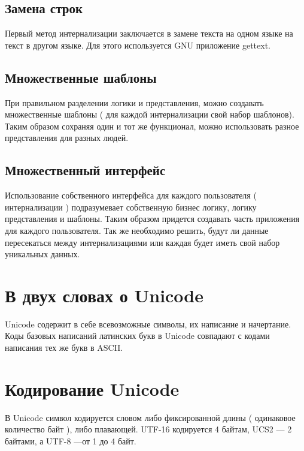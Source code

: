 \subsection{Замена строк} \label{sect3_3_1}

Первый метод интернализации заключается в замене текста на одном языке на текст в другом языке. Для этого используется GNU приложение gettext.

\subsection{Множественные шаблоны} \label{sect3_3_2}

При правильном разделении логики и представления, можно создавать множественные шаблоны ( для каждой интернализации свой набор шаблонов). Таким образом сохраняя один и тот же функционал, можно использовать разное представления для разных людей.


\subsection{Множественный интерфейс} \label{sect3_3_3}

Использование собственного интерфейса для каждого пользователя ( интернализации ) подразумевает собственную бизнес логику, логику представления и шаблоны. Таким образом  придется создавать часть приложения для каждого пользователя. Так же необходимо решить, будут ли данные пересекаться между интернализациями или каждая будет иметь свой набор уникальных данных.

\section{В двух словах о Unicode} \label{sect3_4}

Unicode содержит в себе всевозможные символы, их написание и начертание. Коды базовых написаний латинских букв в Unicode совпадают с кодами написания тех же букв в ASCII. 


\section{Кодирование Unicode} \label{sect3_5}

В Unicode символ кодируется словом либо фиксированной длины ( одинаковое количество байт ), либо плавающей. UTF-16 кодируется 4 байтам, UCS2 --- 2 байтами,  а UTF-8 ---от 1 до 4 байт.


